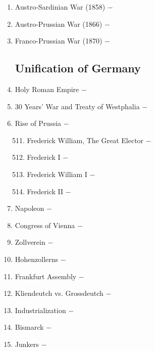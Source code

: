 \documentclass[12pt]{article}
\begin{document}
\begin{enumerate}
\item Austro-Sardinian War (1858) $-$ 

\item Austro-Prussian War (1866) $-$ 

\item Franco-Prussian War (1870) $-$ 

\subsection{Unification of Germany}

\item Holy Roman Empire $-$ 

\item 30 Years' War and Treaty of Westphalia $-$ 

\item Rise of Prussia $-$ 

\begin{enumerate}[label=\arabic{*}.]
\setcounter{enumii}{510}

\item Frederick William, The Great Elector $-$ 

\item Frederick I $-$ 

\item Frederick William I $-$ 

\item Frederick II $-$ 

\end{enumerate}
\setcounter{enumi}{514}

\item Napoleon $-$ 

\item Congress of Vienna $-$ 

\item Zollverein $-$ 

\item Hohenzollerns $-$ 

\item Frankfurt Assembly $-$ 

\item Kliendeutch vs. Grossdeutch $-$ 

\item Industrialization $-$ 

\item Bismarck $-$ 

\item Junkers $-$ 


\end{enumerate}
\end{document}
